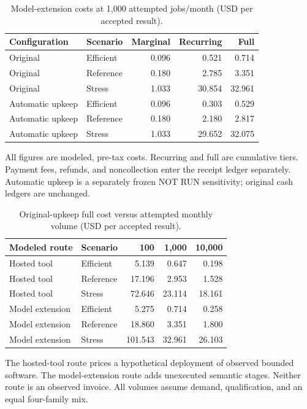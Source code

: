 \begin{table}[tbp]
\centering\small
\caption{Model-extension costs at 1,000 attempted jobs/month (USD per accepted result).}
\label{tab:ec-tiers}
\begin{tabular}{llrrr}
\toprule
Configuration & Scenario & Marginal & Recurring & Full \\
\midrule
Original & Efficient & 0.096 & 0.521 & 0.714 \\
Original & Reference & 0.180 & 2.785 & 3.351 \\
Original & Stress & 1.033 & 30.854 & 32.961 \\
Automatic upkeep & Efficient & 0.096 & 0.303 & 0.529 \\
Automatic upkeep & Reference & 0.180 & 2.180 & 2.817 \\
Automatic upkeep & Stress & 1.033 & 29.652 & 32.075 \\
\bottomrule
\end{tabular}
\par\smallskip\begin{minipage}{0.97\linewidth}\footnotesize All figures are modeled, pre-tax costs. Recurring and full are cumulative tiers. Payment fees, refunds, and noncollection enter the receipt ledger separately. Automatic upkeep is a separately frozen NOT RUN sensitivity; original cash ledgers are unchanged.
\end{minipage}
\end{table}

\begin{table}[tbp]
\centering\small
\caption{Original-upkeep full cost versus attempted monthly volume (USD per accepted result).}
\label{tab:ec-volume}
\begin{tabular}{llrrr}
\toprule
Modeled route & Scenario & 100 & 1,000 & 10,000 \\
\midrule
Hosted tool & Efficient & 5.139 & 0.647 & 0.198 \\
Hosted tool & Reference & 17.196 & 2.953 & 1.528 \\
Hosted tool & Stress & 72.646 & 23.114 & 18.161 \\
Model extension & Efficient & 5.275 & 0.714 & 0.258 \\
Model extension & Reference & 18.860 & 3.351 & 1.800 \\
Model extension & Stress & 101.543 & 32.961 & 26.103 \\
\bottomrule
\end{tabular}
\par\smallskip\begin{minipage}{0.97\linewidth}\footnotesize The hosted-tool route prices a hypothetical deployment of observed bounded software. The model-extension route adds unexecuted semantic stages. Neither route is an observed invoice. All volumes assume demand, qualification, and an equal four-family mix.
\end{minipage}
\end{table}



